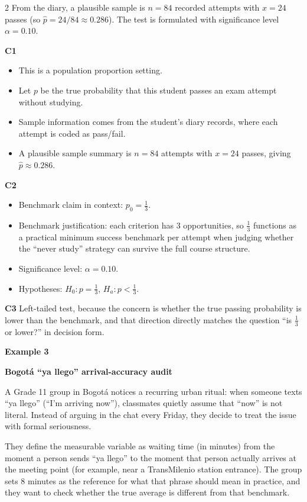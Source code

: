 \documentclass[12pt]{article}
\newcommand{\SubsectionBox}[1]{%
\noindent\colorbox{gray!30}{%
\parbox{\linewidth}{\textbf{#1}}%
}\par\vspace{0.35cm}%
}
\begin{document}
\begin{multicols}{2}
From the diary, a plausible sample is \(n=84\) recorded attempts with \(x=24\) passes (so \(\hat{p}=24/84\approx0.286\)). The test is formulated with significance level \(\alpha=0.10\).

\textbf{C1}
\begin{itemize}
\item This is a population proportion setting.
\item Let \(p\) be the true probability that this student passes an exam attempt without studying.
\item Sample information comes from the student's diary records, where each attempt is coded as pass/fail.
\item A plausible sample summary is \(n=84\) attempts with \(x=24\) passes, giving \(\hat{p}\approx0.286\).
\end{itemize}

\textbf{C2}
\begin{itemize}
\item Benchmark claim in context: \(p_0=\frac{1}{3}\).
\item Benchmark justification: each criterion has 3 opportunities, so \(\frac{1}{3}\) functions as a practical minimum success benchmark per attempt when judging whether the ``never study'' strategy can survive the full course structure.
\item Significance level: \(\alpha=0.10\).
\item Hypotheses: \(H_0\colon p=\frac{1}{3}\), \(H_a\colon p<\frac{1}{3}\).
\end{itemize}

\textbf{C3}
Left-tailed test, because the concern is whether the true passing probability is lower than the benchmark, and that direction directly matches the question ``is \(\frac{1}{3}\) or lower?'' in decision form.



\vspace{0.25cm}
\SubsectionBox{Example 3}\vspace{-0.25cm}

\textbf{Bogotá ``ya llego'' arrival-accuracy audit}

A Grade 11 group in Bogotá notices a recurring urban ritual: when someone texts ``ya llego'' (``I'm arriving now''), classmates quietly assume that ``now'' is not literal. Instead of arguing in the chat every Friday, they decide to treat the issue with formal seriousness.

They define the measurable variable as waiting time (in minutes) from the moment a person sends ``ya llego'' to the moment that person actually arrives at the meeting point (for example, near a TransMilenio station entrance). The group sets 8 minutes as the reference for what that phrase should mean in practice, and they want to check whether the true average is different from that benchmark.



\end{multicols}
\end{document}
